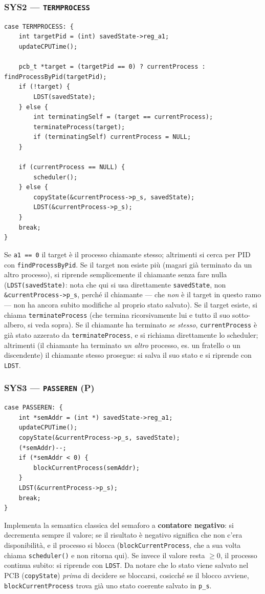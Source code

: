 \documentclass[11pt,a4paper]{article}
\newcommand{\code}[1]{\texttt{#1}}
\begin{document}
\subsubsection{SYS2 --- \code{TERMPROCESS}}
\label{subsub:sys2-termprocess}
\begin{lstlisting}
case TERMPROCESS: {
    int targetPid = (int) savedState->reg_a1;
    updateCPUTime();

    pcb_t *target = (targetPid == 0) ? currentProcess : findProcessByPid(targetPid);
    if (!target) {
        LDST(savedState);
    } else {
        int terminatingSelf = (target == currentProcess);
        terminateProcess(target);
        if (terminatingSelf) currentProcess = NULL;
    }

    if (currentProcess == NULL) {
        scheduler();
    } else {
        copyState(&currentProcess->p_s, savedState);
        LDST(&currentProcess->p_s);
    }
    break;
}
\end{lstlisting}
Se \code{a1 == 0} il target è il processo chiamante stesso; altrimenti si
cerca per PID con \code{findProcessByPid}. Se il target non esiste più
(magari già terminato da un altro processo), si riprende semplicemente il
chiamante senza fare nulla (\code{LDST(savedState)}: nota che qui si usa
direttamente \code{savedState}, non \code{\&currentProcess->p\_s}, perché il
chiamante --- che \emph{non} è il target in questo ramo --- non ha ancora
subito modifiche al proprio stato salvato). Se il target esiste, si chiama
\code{terminateProcess} (che termina ricorsivamente lui e tutto il suo
sotto-albero, si veda sopra). Se il chiamante ha terminato \emph{se stesso},
\code{currentProcess} è già stato azzerato da \code{terminateProcess}, e si
richiama direttamente lo scheduler; altrimenti (il chiamante ha terminato
\emph{un altro} processo, es. un fratello o un discendente) il chiamante
stesso prosegue: si salva il suo stato e si riprende con \code{LDST}.

\subsubsection{SYS3 --- \code{PASSEREN} (P)}
\begin{lstlisting}
case PASSEREN: {
    int *semAddr = (int *) savedState->reg_a1;
    updateCPUTime();
    copyState(&currentProcess->p_s, savedState);
    (*semAddr)--;
    if (*semAddr < 0) {
        blockCurrentProcess(semAddr);
    }
    LDST(&currentProcess->p_s);
    break;
}
\end{lstlisting}
Implementa la semantica classica del semaforo a \textbf{contatore
negativo}: si decrementa sempre il valore; se il risultato è negativo
significa che non c'era disponibilità, e il processo si blocca
(\code{blockCurrentProcess}, che a sua volta chiama \code{scheduler()} e non
ritorna qui). Se invece il valore resta $\ge 0$, il processo continua
subito: si riprende con \code{LDST}. Da notare che lo stato viene salvato
nel PCB (\code{copyState}) \emph{prima} di decidere se bloccarsi, cosicché
se il blocco avviene, \code{blockCurrentProcess} trova già uno stato
coerente salvato in \code{p\_s}.
\end{document}
